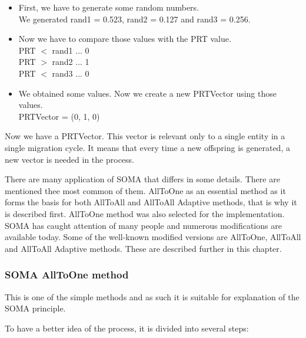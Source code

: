 \documentclass[review]{elsarticle}
\begin{document}
\begin{itemize}
	\item First, we have to generate some random numbers. \\
	We generated rand1 = 0.523, rand2 = 0.127 and rand3 = 0.256.
	\item Now we have to compare those values with the PRT value. \\
	PRT $<$ rand1 ... 0 \\
	PRT $>$ rand2 ... 1 \\
	PRT $<$ rand3 ... 0 
	\item We obtained some values. Now we create a new PRTVector using those values. \\
	PRTVector = (0, 1, 0) \\
\end{itemize}
Now we have a PRTVector. This vector is relevant only to a single entity in a single migration cycle. It means that every time a new offspring is generated, a new vector is needed in the process. 
\vspace{10pt}

There are many application of SOMA that differs in some details. There are mentioned thee most common of them.
AllToOne as an essential method as it forms the basis for both AllToAll and AllToAll Adaptive methods, that is why it is described first. AllToOne method was also selected for the implementation.
SOMA has caught attention of many people and numerous modifications are available today. Some of the well-known modified versions are AllToOne, AllToAll and AllToAll Adaptive methods. These are described further in this chapter.

\subsubsection{SOMA AllToOne method}
This is one of the simple methods and as such it is suitable for explanation of the SOMA principle.

To have a better idea of the process, it is divided into several steps:
\end{document}
